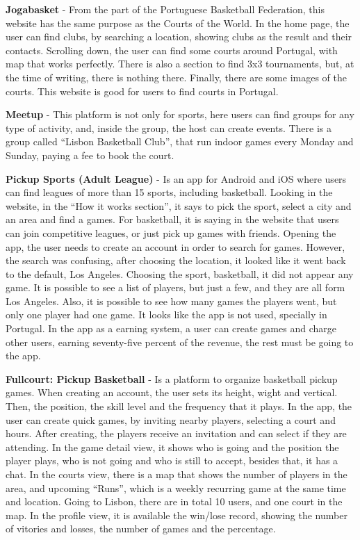 \textbf{Jogabasket}\cite{jogabasket} - From the part of the Portuguese Basketball Federation, this website has the same purpose as the Courts of the World.
In the home page, the user can find clubs, by searching a location, showing clubs as the result and their contacts.
Scrolling down, the user can find some courts around Portugal, with map that works perfectly.
There is also a section to find 3x3 tournaments, but, at the time of writing, there is nothing there.
Finally, there are some images of the courts.
This website is good for users to find courts in Portugal.

\textbf{Meetup}\cite{meetup} - This platform is not only for sports, here users can find groups for any type of activity, and, inside the group, the host can create events.
There is a group called ``Lisbon Basketball Club''\cite{meetup-basketball-group}, that run indoor games every Monday and Sunday, paying a fee to book the court.

\textbf{Pickup Sports (Adult League)}\cite{pickup-adult, pickup-adult-app} - Is an app for Android and iOS where users can find leagues of more than 15 sports, including basketball.
Looking in the website\cite{pickup-adult}, in the ``How it works section'', it says to pick the sport, select a city and an area and find a games.
For basketball, it is saying in the website that users can join competitive leagues, or just pick up games with friends.
Opening the app, the user needs to create an account in order to search for games.
However, the search was confusing, after choosing the location, it looked like it went back to the default, Los Angeles.
Choosing the sport, basketball, it did not appear any game.
It is possible to see a list of players, but just a few, and they are all form Los Angeles.
Also, it is possible to see how many games the players went, but only one player had one game.
It looks like the app is not used, specially in Portugal.
In the app as a earning system, a user can create games and charge other users, earning seventy-five percent of the revenue, the rest must be going to the app.

\textbf{Fullcourt: Pickup Basketball}\cite{fullcourt, fullcourt-pp} - Is a platform to organize basketball pickup games.
When creating an account, the user sets its height, wight and vertical.
Then, the position, the skill level and the frequency that it plays.
In the app, the user can create quick games, by inviting nearby players, selecting a court and hours.
After creating, the players receive an invitation and can select if they are attending.
In the game detail view, it shows who is going and the position the player plays, who is not going and who is still to accept, besides that, it has a chat.
In the courts view, there is a map that shows the number of players in the area, and upcoming ``Runs'', which is a weekly recurring game at the same time and location.
Going to Lisbon, there are in total 10 users, and one court in the map.
In the profile view, it is available the win/lose record, showing the number of vitories and losses, the number of games and the percentage.

